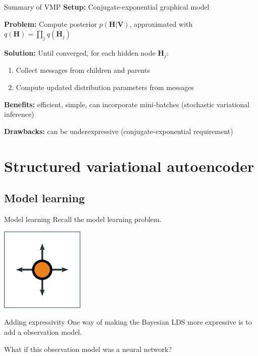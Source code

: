 \documentclass[10pt, compress]{beamer}
\begin{document}
\begin{frame}{Summary of VMP}
	\textbf{Setup:} Conjugate-exponential graphical model

	\pause
	\textbf{Problem:} Compute posterior $p(\mathbf{H} | \mathbf{V})$, approximated with $q(\mathbf{H}) = \prod_j q(\mathbf{H}_j)$

	\pause
	\textbf{Solution:} Until converged, for each hidden node $\mathbf{H}_j$:
	\begin{enumerate}
			\pause
		\item Collect messages from children and parents
			\pause
		\item Compute updated distribution parameters from messages
	\end{enumerate}

	\pause
	\textbf{Benefits:} efficient, simple, can incorporate mini-batches (stochastic variational inference)

	\pause
	\textbf{Drawbacks:} can be underexpressive (conjugate-exponential requirement)
\end{frame}

\section{Structured variational autoencoder}

\subsection{Model learning}

\begin{frame}{Model learning}
	Recall the model learning problem.
	\pause
	\begin{center}
		\includegraphics[width=0.3\textwidth]{img/agent-env-1.png}
	\end{center}

	\pause
	\centering
	
\end{frame}

\begin{frame}{Adding expressivity}
	One way of making the Bayesian LDS more expressive
	is to add a observation model.

	\pause

	\centering
	

	\pause

	What if this observation model was a neural network?
\end{frame}
\end{document}
